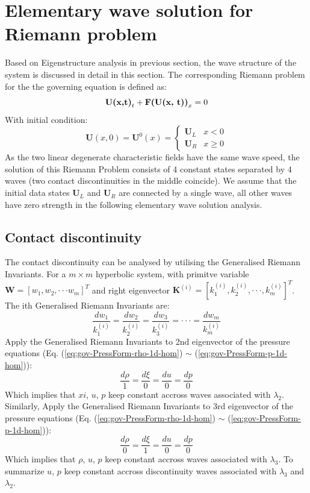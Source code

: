 \section{Elementary wave solution for Riemann problem}
Based on Eigenstructure analysis in previous section, the wave structure of the system is discussed in detail in this section. 
The corresponding Riemann problem for the the governing equation is defined as: 
\begin{equation}
\textbf{U(x,t)}_t + \textbf{F(\textbf{U}(x, t))}_x = 0
\end{equation}
With initial condition: 
\begin{equation}
\textbf{U}(x, 0) = \textbf{U}^0(x) = \begin{cases} 
      \textbf{U}_L & x< 0\\
      \textbf{U}_R & x\geq 0
\end{cases}
\end{equation}
As the two linear degenerate characteristic fields have the same wave speed, the solution of this Riemann Problem consists of 4 constant states separated by 4 waves (two contact discontinuities in the middle coincide). 
We assume that the initial data states $\textbf{U}_L$ and $\textbf{U}_R$ are connected by a single wave, all other waves have zero strength in the following elementary wave solution analysis.

\subsection{Contact discontinuity}
The contact discontinuity can be analysed by utilising the Generalised Riemann Invariants. For a $m \times m$ hyperbolic system, with primitve variable $\textbf{W} = \left[ w_1, w_2, \cdot \cdot \cdot w_m \right]^T$ and right eigenvector $\textbf{K}^{(i)}=[k^{(i)}_1,k^{(i)}_2, \cdot\cdot\cdot, k^{(i)}_m]^T$. The ith Generalised Riemann Invariants are: 
\begin{equation}
\frac{dw_1}{k^{(i)}_1}=\frac{dw_2}{k^{(i)}_2}=\frac{dw_3}{k^{(i)}_3}=\cdot\cdot\cdot=\frac{dw_m}{k^{(i)}_m}
\label{eq:Generalised-Riemann-Invariants}
\end{equation}
Apply the Generalised Riemann Invariants to 2nd eigenvector of the pressure equations (Eq. (\ref{eq:gov-PressForm-rho-1d-hom}) $\sim$ (\ref{eq:gov-PressForm-p-1d-hom})): 
\begin{equation}
\frac{d \rho}{1}=\frac{d \xi}{0} = \frac{d u}{0} = \frac{d p}{0}
\end{equation}
Which implies that $xi$, $u$, $p$ keep constant accross waves associated with $\lambda_2$. 
Similarly, Apply the Generalised Riemann Invariants to 3rd eigenvector of the pressure equations (Eq. (\ref{eq:gov-PressForm-rho-1d-hom}) $\sim$ (\ref{eq:gov-PressForm-p-1d-hom})):
\begin{equation}
\frac{d \rho}{0}=\frac{d \xi}{1} = \frac{d u}{0} = \frac{d p}{0}
\end{equation}
Which implies that $\rho$, $u$, $p$ keep constant accross waves associated with $\lambda_3$.
To summarize $u$, $p$ keep constant accross discontinuity waves associated with $\lambda_3$ and $\lambda_2$.

